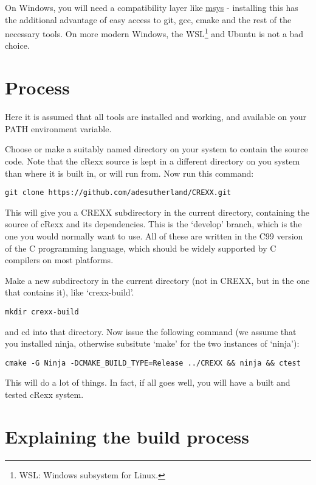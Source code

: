 On Windows, you will need a compatibility layer like
\href{https://www.msys2.org}{msys} - installing this has the additional
advantage of easy access to git, gcc, cmake and the rest of the
necessary tools. On more modern Windows, the WSL\footnote{WSL: Windows
  subsystem for Linux.} and Ubuntu is not a bad choice.

\hypertarget{process}{%
\section{Process}\label{process}}

Here it is assumed that all tools are installed and working, and
available on your PATH environment variable.

Choose or make a suitably named directory on your system to contain the
source code. Note that the cRexx source is kept in a different directory
on you system than where it is built in, or will run from. Now run this
command:

\begin{verbatim}
git clone https://github.com/adesutherland/CREXX.git
\end{verbatim}

This will give you a CREXX subdirectory in the current directory,
containing the source of cRexx and its dependencies. This is the
`develop' branch, which is the one you would normally want to use. All
of these are written in the C99 version of the C programming language,
which should be widely supported by C compilers on most platforms.

Make a new subdirectory in the current directory (not in CREXX, but in
the one that contains it), like `crexx-build'.

\begin{verbatim}
mkdir crexx-build
\end{verbatim}

and cd into that directory. Now issue the following command (we assume
that you installed ninja, otherwise subsitute `make' for the two
instances of `ninja'):

\begin{verbatim}
cmake -G Ninja -DCMAKE_BUILD_TYPE=Release ../CREXX && ninja && ctest
\end{verbatim}

This will do a lot of things. In fact, if all goes well, you will have a
built and tested cRexx system.

\hypertarget{explaining-the-build-process}{%
\section{Explaining the build
process}\label{explaining-the-build-process}}

